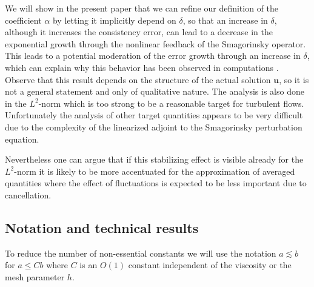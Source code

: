 \documentclass[10pt]{amsart}
\numberwithin{equation}{section}
\theoremstyle{definition}
\theoremstyle{remark}
\renewcommand{\(}{\bigl(}
\renewcommand{\)}{\bigr)}
\newcommand{\bld}[1]{\boldsymbol{#1}}
\newcommand{\bu}{\bld{u}}
\begin{document}
We will
show in the present paper that we can refine our definition of the
coefficient $\alpha$ by letting it  
implicitly depend on $\delta$, so that an increase in $\delta$, although
it increases the consistency error, can lead to a decrease in the
exponential growth through the nonlinear feedback of the Smagorinsky
operator. This leads to a potential moderation of the error growth through an
increase in $\delta$, which can explain
why this behavior has been observed in computations \cite{Ge09}. Observe that
this result depends on the structure of the actual solution $\bu$, so
it is not a general statement and only of qualitative nature. The
analysis is also done in the $L^2$-norm which is too strong to be a
reasonable target for turbulent flows. Unfortunately the analysis of other target
quantities appears to be very difficult due to the complexity of the
linearized adjoint to the Smagorinsky perturbation equation.

Nevertheless one can argue that if this stabilizing effect is visible
already for the $L^2$-norm it is likely to be more accentuated for the
approximation of averaged quantities where the effect of fluctuations
is expected to be less important due to cancellation.

\subsection{Notation and technical results}
To reduce the number of non-essential constants we will use the
notation $a \lesssim b$ for $a \leq C b$ where $C$ is an $O(1)$
constant independent of the viscosity or the mesh parameter $h$.
\end{document}
